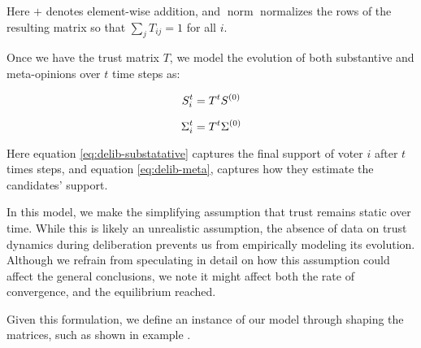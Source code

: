 Here $+$ denotes element-wise addition, and $\operatorname{norm}$ normalizes the rows of the resulting matrix so that $\sum_j T_{ij} = 1$ for all $i$.


Once we have the trust matrix $T$, we model the evolution of both substantive
and meta-opinions over $t$ time steps as:

\begin{equation}
	S_{i}^{t} = T^{t}S^{(0)}
	\label{eq:delib-substatative}
\end{equation}

\begin{equation}
	\Sigma_{i}^{t} = T^{t}\Sigma^{(0)}
	\label{eq:delib-meta}
\end{equation}

Here equation \ref{eq:delib-substatative} captures the final support of voter
$i$ after $t$ times steps, and equation \ref{eq:delib-meta}, captures how they
estimate the candidates' support.


In this model, we make the simplifying assumption that trust remains static
over time. While this is likely an unrealistic assumption, the absence of data on
trust dynamics during deliberation prevents us from empirically modeling its
evolution. Although we refrain from speculating in detail on how this
assumption could affect the general conclusions, we note it might affect both
the rate of convergence, and the equilibrium reached.

Given this formulation, we define an instance of our model through shaping the
matrices, such as shown in example .

